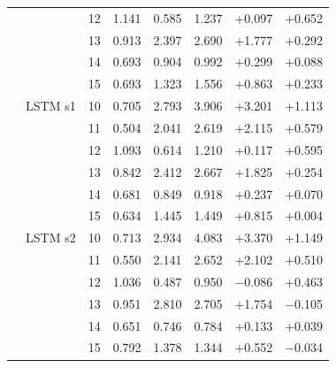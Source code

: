 \begin{footnotesize}
\begin{longtable}{lllrrrrr}
 &  & 12 & 1.141 & 0.585 & 1.237 & +0.097 & +0.652 \\
 &  & 13 & 0.913 & 2.397 & 2.690 & +1.777 & +0.292 \\
 &  & 14 & 0.693 & 0.904 & 0.992 & +0.299 & +0.088 \\
 &  & 15 & 0.693 & 1.323 & 1.556 & +0.863 & +0.233 \\
 & LSTM s1 & 10 & 0.705 & 2.793 & 3.906 & +3.201 & +1.113 \\
 &  & 11 & 0.504 & 2.041 & 2.619 & +2.115 & +0.579 \\
 &  & 12 & 1.093 & 0.614 & 1.210 & +0.117 & +0.595 \\
 &  & 13 & 0.842 & 2.412 & 2.667 & +1.825 & +0.254 \\
 &  & 14 & 0.681 & 0.849 & 0.918 & +0.237 & +0.070 \\
 &  & 15 & 0.634 & 1.445 & 1.449 & +0.815 & +0.004 \\
 & LSTM s2 & 10 & 0.713 & 2.934 & 4.083 & +3.370 & +1.149 \\
 &  & 11 & 0.550 & 2.141 & 2.652 & +2.102 & +0.510 \\
 &  & 12 & 1.036 & 0.487 & 0.950 & $-$0.086 & +0.463 \\
 &  & 13 & 0.951 & 2.810 & 2.705 & +1.754 & $-$0.105 \\
 &  & 14 & 0.651 & 0.746 & 0.784 & +0.133 & +0.039 \\
 &  & 15 & 0.792 & 1.378 & 1.344 & +0.552 & $-$0.034 \\
\end{longtable}
\end{footnotesize}
